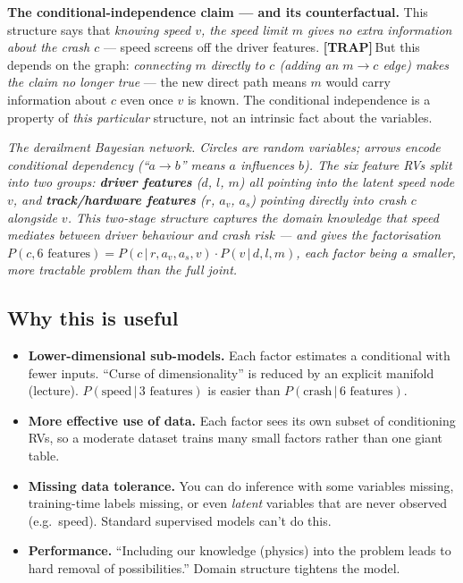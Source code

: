 \documentclass[11pt, a4paper]{article}
\newcommand{\trapflag}{\textcolor{trapBd}{\textbf{[TRAP]}}\,}
\begin{document}
\textbf{The conditional-independence claim — and its counterfactual.} This structure says that \emph{knowing speed $v$, the speed limit $m$ gives no extra information about the crash $c$} — speed screens off the driver features. \trapflag{}But this depends on the graph: \emph{connecting $m$ directly to $c$ (adding an $m \to c$ edge) makes the claim no longer true} — the new direct path means $m$ would carry information about $c$ even once $v$ is known. The conditional independence is a property of \emph{this particular} structure, not an intrinsic fact about the variables.

\begin{center}

\footnotesize\textit{The derailment Bayesian network. Circles are random variables; arrows encode conditional dependency (``$a \to b$'' means $a$ influences $b$). The six feature RVs split into two groups: \textbf{driver features} ($d$, $l$, $m$) all pointing into the latent speed node $v$, and \textbf{track/hardware features} ($r$, $a_v$, $a_s$) pointing directly into crash $c$ alongside $v$. This two-stage structure captures the domain knowledge that speed mediates between driver behaviour and crash risk --- and gives the factorisation $P(c,\text{6 features}) = P(c\,|\,r,a_v,a_s,v)\cdot P(v\,|\,d,l,m)$, each factor being a smaller, more tractable problem than the full joint.}
\end{center}

\subsection{Why this is useful}

\begin{itemize}
  \item \textbf{Lower-dimensional sub-models.} Each factor estimates a conditional with fewer inputs. ``Curse of dimensionality'' is reduced by an explicit manifold (lecture). $P(\text{speed}\,|\,\text{3 features})$ is easier than $P(\text{crash}\,|\,\text{6 features})$.
  \item \textbf{More effective use of data.} Each factor sees its own subset of conditioning RVs, so a moderate dataset trains many small factors rather than one giant table.
  \item \textbf{Missing data tolerance.} You can do inference with some variables missing, training-time labels missing, or even \emph{latent} variables that are never observed (e.g.\ speed). Standard supervised models can't do this.
  \item \textbf{Performance.} ``Including our knowledge (physics) into the problem leads to hard removal of possibilities.'' Domain structure tightens the model.
\end{itemize}
\end{document}
